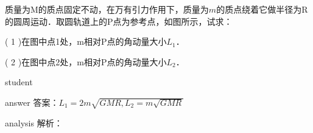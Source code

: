 \begin{example}
	 质量为M的质点固定不动，在万有引力作用下，质量为$ m $的质点绕着它做半径为R的圆周运动．取圆轨道上的P点为参考点，如图所示，试求：
	 
	 ( 1 )在图中点1处，m相对P点的角动量大小$ L_1 $．
	 
	 ( 2 )在图中点2处，m相对P点的角动量大小$ L_2 $．
	 
	
	\begin{taggedblock}{student}
		\vspace*{1cm}
	\end{taggedblock}
	
	
	\begin{taggedblock}{answer}
		答案：$ L_1 = 2m\sqrt{GMR,L_2 = m\sqrt{GMR}} $
	\end{taggedblock}
	
	
	\begin{taggedblock}{analysis}
		解析：
	\end{taggedblock}
\end{example}


